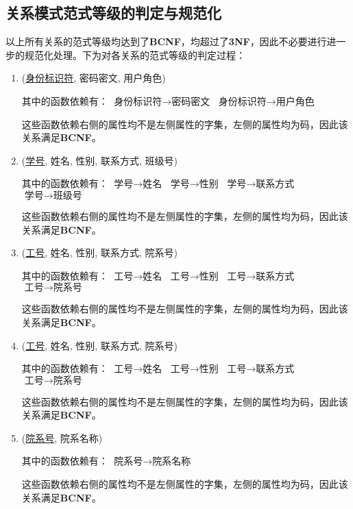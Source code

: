 \subsection{关系模式范式等级的判定与规范化}
\ttfamily
以上所有关系的范式等级均达到了\textnormal{\textbf{BCNF}}，均超过了\textnormal{\textbf{3NF}}，因此不必要进行进一步的规范化处理。下为对各关系的范式等级的判定过程：

\normalfont

\begin{enumerate}
    \item (\uline{身份标识符}, 密码密文, 用户角色) \par
    其中的函数依赖有：
    $\text{身份标识符} \rightarrow \text{密码密文}$
    $\text{身份标识符} \rightarrow \text{用户角色}$ \par
    这些函数依赖右侧的属性均不是左侧属性的字集，左侧的属性均为码，因此该关系满足\textbf{BCNF}。

    \item (\uline{学号}, 姓名, 性别, 联系方式, 班级号) \par
    其中的函数依赖有：
    $\text{学号} \rightarrow \text{姓名}$
    $\text{学号} \rightarrow \text{性别}$
    $\text{学号} \rightarrow \text{联系方式}$
    $\text{学号} \rightarrow \text{班级号}$ \par
    这些函数依赖右侧的属性均不是左侧属性的字集，左侧的属性均为码，因此该关系满足\textbf{BCNF}。

    \item (\uline{工号}, 姓名, 性别, 联系方式, 院系号) \par
    其中的函数依赖有：
    $\text{工号} \rightarrow \text{姓名}$
    $\text{工号} \rightarrow \text{性别}$
    $\text{工号} \rightarrow \text{联系方式}$
    $\text{工号} \rightarrow \text{院系号}$ \par
    这些函数依赖右侧的属性均不是左侧属性的字集，左侧的属性均为码，因此该关系满足\textbf{BCNF}。
    
    \item (\uline{工号}, 姓名, 性别, 联系方式, 院系号) \par
    其中的函数依赖有：
    $\text{工号} \rightarrow \text{姓名}$
    $\text{工号} \rightarrow \text{性别}$
    $\text{工号} \rightarrow \text{联系方式}$
    $\text{工号} \rightarrow \text{院系号}$ \par
    这些函数依赖右侧的属性均不是左侧属性的字集，左侧的属性均为码，因此该关系满足\textbf{BCNF}。
    
    \item (\uline{院系号}, 院系名称) \par
    其中的函数依赖有：
    $\text{院系号} \rightarrow \text{院系名称}$ \par
    这些函数依赖右侧的属性均不是左侧属性的字集，左侧的属性均为码，因此该关系满足\textbf{BCNF}。
    

\end{enumerate}

